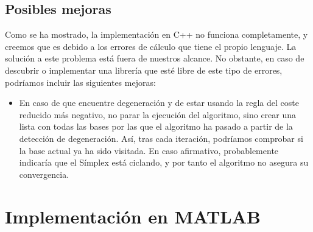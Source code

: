 \documentclass[12pt, titlepage]{article}
\begin{document}
\subsection{Posibles mejoras}
Como se ha mostrado, la implementación en C++ no funciona completamente, y creemos que es debido a los errores de cálculo que tiene el propio lenguaje. La solución a este problema está fuera de nuestros alcance. No obstante, en caso de descubrir o implementar una librería que esté libre de este tipo de errores, podríamos incluir las siguientes mejoras:
\begin{itemize}
\item	En caso de que encuentre degeneración y de estar usando la regla del coste reducido más negativo, no parar la ejecución del algoritmo, sino crear una lista con todas las bases por las que el algoritmo ha pasado a partir de la detección de degeneración. Así, tras cada iteración, podríamos comprobar si la base actual ya ha sido visitada. En caso afirmativo, probablemente indicaría que el Símplex está ciclando, y por tanto el algoritmo no asegura su convergencia.
\end{itemize}
\newpage
\section{Implementación en MATLAB}
	
\end{document}
